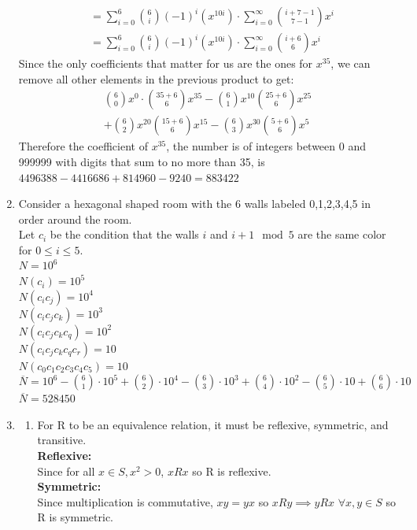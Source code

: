\documentclass[11pt]{article}
\begin{document}
\begin{enumerate}[]
\begin{align}
		&=\sum_{i=0}^{6} \binom{6}{i}(-1)^i(x^{10i}) \cdot \sum_{i=0}^{\infty} \binom{i+7-1}{7-1}x^i  \nonumber\\
		&=\sum_{i=0}^{6} \binom{6}{i}(-1)^i(x^{10i}) \cdot \sum_{i=0}^{\infty} \binom{i+6}{6}x^i  \nonumber
	\end{align}
Since the only coefficients that matter for us are the ones for $x^{35}$, we can remove all other elements in the previous product to get:
	\begin{align}
	\binom{6}{0}x^0\cdot\binom{35+6}{6}x^{35}-\binom{6}{1}x^{10}\binom{25+6}{6}x^{25} \nonumber\\ +\binom{6}{2}x^{20}\binom{15+6}{6}x^{15}-\binom{6}{3}x^{30}\binom{5+6}{6}x^{5} \nonumber
	\end{align}
Therefore the coefficient of $x^{35}$, the number is of integers between 0 and 999999 with digits that sum to no more than 35, is $4496388-4416686+814960-9240=883422$
\item
Consider a hexagonal shaped room with the 6 walls labeled 0,1,2,3,4,5 in order around the room.\\
Let $c_i$ be the condition that the walls $i$ and $i+1\mod 5$ are the same color for $0\leq i\leq5$.\\
$N=10^6$\\
$N(c_i)=10^5$\\
$N({c_i}{c_j})=10^4$\\
$N({c_i}{c_j}{c_k})=10^3$\\
$N({c_i}{c_j}{c_k}{c_q})=10^2$\\
$N({c_i}{c_j}{c_k}{c_q}{c_r})=10$\\
$N({c_0}{c_1}{c_2}{c_3}{c_4}{c_5})=10$\\
$\overline{N} = 10^6 - \binom{6}{1}\cdot 10^5 + \binom{6}{2}\cdot 10^4 - \binom{6}{3}\cdot 10^3 + \binom{6}{4}\cdot 10^2 - \binom{6}{5}\cdot 10 + \binom{6}{6}\cdot 10$\\
$\overline{N} = 528450$
\item
	\begin{enumerate}[label=\alph*]
	\item For R to be an equivalence relation, it must be reflexive, symmetric, and transitive.\\
	\textbf{Reflexive:}\\
	Since for all $x\in S, x^2 > 0$, $xRx$ so R is reflexive.\\
	\textbf{Symmetric:}\\
	Since multiplication is commutative, $xy=yx$ so $xRy \implies yRx$ $\forall x,y\in S$ so R is symmetric. \\

\end{enumerate}
\end{enumerate}
\end{document}
